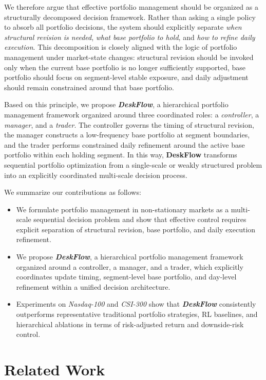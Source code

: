 \documentclass[letterpaper]{article} %
\begin{document}
We therefore argue that effective portfolio management should be organized as a structurally decomposed decision framework. Rather than asking a single policy to absorb all portfolio decisions, the system should explicitly separate \emph{when structural revision is needed}, \emph{what base portfolio to hold}, and \emph{how to refine daily execution}. This decomposition is closely aligned with the logic of portfolio management under market-state changes: structural revision should be invoked only when the current base portfolio is no longer sufficiently supported, base portfolio should focus on segment-level stable exposure, and daily adjustment should remain constrained around that base portfolio.

Based on this principle, we propose \textit{\textbf{DeskFlow}}, a hierarchical portfolio management framework organized around three coordinated roles: a \emph{controller}, a \emph{manager}, and a \emph{trader}. The controller governs the timing of structural revision, the manager constructs a low-frequency base portfolio at segment boundaries, and the trader performs constrained daily refinement around the active base portfolio within each holding segment. In this way, \textbf{DeskFlow} transforms sequential portfolio optimization from a single-scale or weakly structured problem into an explicitly coordinated multi-scale decision process.

We summarize our contributions as follows:
\begin{itemize}
    \item We formulate portfolio management in non-stationary markets as a multi-scale sequential decision problem and show that effective control requires explicit separation of structural revision, base portfolio, and daily execution refinement.
    \item We propose \textit{\textbf{DeskFlow}}, a hierarchical portfolio management framework organized around a controller, a manager, and a trader, which explicitly coordinates update timing, segment-level base portfolio, and day-level refinement within a unified decision architecture.
    \item Experiments on \textit{Nasdaq-100} and \textit{CSI-300} show that \textit{\textbf{DeskFlow}} consistently outperforms representative traditional portfolio strategies, RL baselines, and hierarchical ablations in terms of risk-adjusted return and downside-risk control.
\end{itemize}

\section{Related Work}
\end{document}
